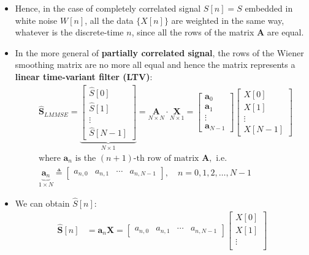 \begin{itemize}
\item Hence, in the case of completely correlated signal \(S[n]=S\) embedded in white noise \(W[n]\), all the data \(\{X[n]\}\) are weighted in the same way, whatever is the discrete-time \(n\), since all the rows of the matrix \textbf{A} are equal.
\item In the more general of \textbf{partially correlated signal}, the rows of the Wiener smoothing matrix are no more all equal and hence the matrix represents a \textbf{linear time-variant filter (LTV)}:
\begin{align*}
&\mathbf{\hat{S}}_{LMMSE}
=
\underbrace{\begin{bmatrix}
    \hat{S}[0] \\
    \hat{S}[1] \\
    \vdots \\
    \hat{S}[N-1]
\end{bmatrix}}_{N\times1}
= \underset{N \times N}{\mathbf{A}} \cdot \underset{N \times 1}{\mathbf{X}}
=
\begin{bmatrix}
    \mathbf{a}_0 \\
    \mathbf{a}_1 \\
    \vdots \\
    \mathbf{a}_{N-1}
\end{bmatrix}
\begin{bmatrix}
    X[0] \\
    X[1] \\
    \vdots \\
    X[N-1]
\end{bmatrix}\\[8pt]
&\text{where } \mathbf{a}_n \text{ is the } (n+1)\text{-th row of matrix } \mathbf{A}, \text{ i.e.}\\[8pt]
&\underbrace{\mathbf{a}_n}_{1\times N} \triangleq \begin{bmatrix} a_{n,0} & a_{n,1} & \cdots & a_{n,N-1} \end{bmatrix}, \quad n = 0, 1, 2, \dots, N-1
\end{align*}
\item We can obtain \(\hat{S}[n]\):
\begin{align*}
\mathbf{\hat{S}}[n] &= \mathbf{a}_n \mathbf{X} = \begin{bmatrix} a_{n,0} & a_{n,1} & \cdots & a_{n,N-1} \end{bmatrix}
\begin{bmatrix}
    X[0] \\
    X[1] \\
    \vdots \\

\end{bmatrix}
\end{align*}
\end{itemize}
